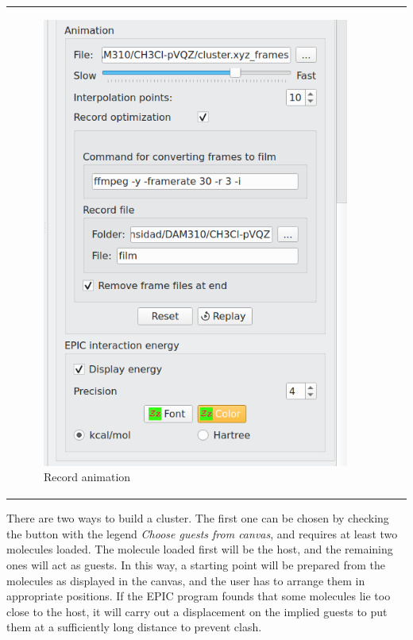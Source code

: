 \documentclass[10pt]{article}
\begin{document}
\begin{tabular}{lcr}
\begin{minipage}{.3\linewidth}
\begin{figure}[H]
    \begin{center}
        \vspace*{-4mm}
        \includegraphics[width=0.74\linewidth]{damqt320_mespimizer_3.png}
    \end{center}
    \vspace*{17mm}
    \caption{Record animation\label{fig:4_10_3}}
\end{figure}
\end{minipage}
\end{tabular}

\vspace*{5mm}

There are two ways to build a cluster. The first one can be chosen by 
checking the button with the legend {\it  Choose guests from canvas}, and
requires at least two molecules loaded. The molecule loaded 
first will be the host, and the remaining ones will act as guests.
In this way, a starting point will be prepared from the molecules as 
displayed in the canvas, and the user has to arrange them in appropriate 
positions. If the EPIC program founds that some molecules lie too close
to the host, 
it will carry out a displacement on the implied guests to put them at a 
sufficiently long distance to prevent clash.
\end{document}
